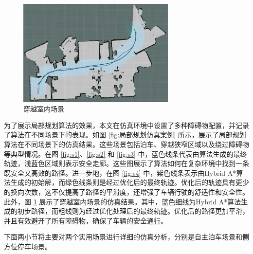\documentclass[master,academic]{ysuthesis} %
\begin{document}
	\begin{figure}[!ht]
		\centering
		\includegraphics[width=0.7\textwidth]{nmpcyuewa1.png}
		\caption{穿越室内场景}
		\label{fig:nmpcyuewa1}
	\end{figure}

	为了展示局部规划算法的效果，本文在仿真环境中设置了多种障碍物配置，并记录了算法在不同场景下的表现。如图 \ref{fig:局部规划仿真案例} 所示，展示了局部规划算法在不同场景下的仿真结果。这些场景包括泊车、穿越狭窄区域以及绕过障碍物等典型情况。在图 \ref{fig:s1}、\ref{fig:s2} 和 \ref{fig:s3} 中，蓝色线条代表由算法生成的最终轨迹，浅蓝色区域则表示安全走廊。这些图展示了算法如何在复杂环境中找到一条既安全又高效的路径。进一步地，在图 \ref{fig:s4} 中，紫色线条表示由Hybrid A*算法生成的初始解，而绿色线条则是经过优化后的最终轨迹。优化后的轨迹具有更少的换向次数，这不仅提高了路径的平滑度，还增强了车辆行驶的舒适性和安全性。此外，图 \ref{fig:nmpcyuewa1} 展示了穿越室内场景的仿真结果。其中，蓝色细线为Hybrid A*算法生成的初步路径，而粗线则为经过优化处理后的最终轨迹。优化后的路径更加平滑，并且有效避开了所有障碍物，确保了车辆的安全通行。

	下面两小节将主要对两个实用场景进行详细的仿真分析，分别是自主泊车场景和侧方位停车场景。
\end{document}
